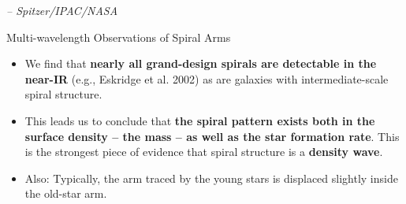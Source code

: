\documentclass[letterpaper,landscape]{slides}
\begin{document}
\begin{slide}

\begin{center}
\vskip -0.0in
\end{center}

\begin{flushright}
{ \tiny \em -- Spitzer/IPAC/NASA }
\end{flushright}

\end{slide}


\begin{slide}
\begin{center}
{\large \color{red} 
                  Multi-wavelength Observations of Spiral Arms  }
\end{center}

\begin{itemize}

\item We find that {\bf nearly all grand-design spirals are detectable in
the near-IR} (e.g., Eskridge et al.  2002) as are galaxies with
intermediate-scale spiral structure.

\item This leads us to conclude that {\bf the spiral pattern exists both in
the surface density -- the mass -- as well as the star formation rate}. 
This is the strongest piece of evidence that spiral structure is a {\bf
density wave}.

\item Also: Typically, the arm traced by the young stars is displaced
slightly inside the old-star arm.

\end{itemize}

\vfill
\end{slide}
\end{document}

